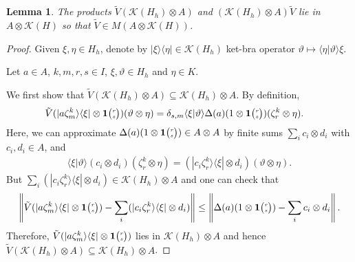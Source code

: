 \documentclass[11pt]{article}
\newcommand{\Grt}[3]{#1{\tiny {\begin{pmatrix} #2\\#3\end{pmatrix}}}}
\newcommand{\UnitC}[2]{\Grt{\mathbf{1}}{#1}{#2}}
\newtheorem{Lem}[Theorem]{Lemma}
\theoremstyle{definition}
\numberwithin{equation}{section}
\begin{document}
 \begin{Lem}\label{lem:reg-corep-mult}
   The products $ \tilde V(\mathcal{K}(H_{h})\otimes A)$ and 
   $(\mathcal{K}(H_{h}) \otimes A)\tilde V$ lie in $A \otimes
   \mathcal{K}(H)$ so that $\tilde V \in M(A\otimes \mathcal{K}(H))$.
 \end{Lem}
 \begin{proof}
   Given $\xi,\eta\in H_{h}$, denote by $|\xi\rangle\langle \eta| \in \mathcal{K}(H_{h})$ ket-bra
   operator $\vartheta \mapsto \langle \eta|\vartheta\rangle \xi$. 

   Let $a\in A$, $k,m,r,s\in I$, $\xi,\vartheta \in H_{h}$ and
   $\eta\in K$. 
   
   We first show that $\tilde V(\mathcal{K}(H_{h})\otimes A) \subseteq
   \mathcal{K}(H_{h}) \otimes A$. By definition,\begin{align*}
     \tilde V(|a\zeta^{k}_{m}\rangle\langle \xi| \otimes \UnitC{r}{s})(\vartheta \otimes \eta) 
     &=     \delta_{s,m} \langle \xi|\vartheta\rangle \Delta(a)(1 \otimes \UnitC{r}{s})(\zeta^{k}_{r}
     \otimes \eta).
   \end{align*} 
   Here, we can approximate $\Delta(a)(1\otimes \UnitC{r}{s}) \in A\otimes A$ by finite sums $\sum_{i} c_{i} \otimes
   d_{i}$ with $c_{i},d_{i} \in A$, and
   \begin{align*}
 \langle \xi|\vartheta\rangle (c_{i} \otimes
d_{i})(\zeta^{k}_{r} \otimes \eta) = 
 (|c_{i}\zeta^{k}_{r}\rangle\langle \xi| \otimes d_{i}) (\vartheta \otimes \eta).
   \end{align*}
But  $\sum_{i} (|c_{i}\zeta^{k}_{r}\rangle\langle \xi| \otimes d_{i}) \in \mathcal{K}(H_{h}) \otimes
A$  and   one can check that%
   \begin{align*}
     \left\|\tilde V(|a\zeta^{k}_{m}\rangle\langle \xi| \otimes \UnitC{r}{s}) -      \sum_{i}
       (|c_{i}\zeta^{k}_{r}\rangle\langle \xi| \otimes d_{i})\right\| \leq
     \left\|\Delta(a)(1\otimes \UnitC{r}{s}) -  \sum_{i} c_{i} \otimes
   d_{i}\right\|.
   \end{align*}
   Therefore, $\tilde V(|a\zeta^{k}_{m}\rangle\langle \xi| \otimes \UnitC{r}{s})$ lies in
   $\mathcal{K}(H_{h}) \otimes A$ and hence $\tilde V(\mathcal{K}(H_{h})\otimes A) \subseteq
   \mathcal{K}(H_{h}) \otimes A$.
   


\end{proof}
\end{document}
